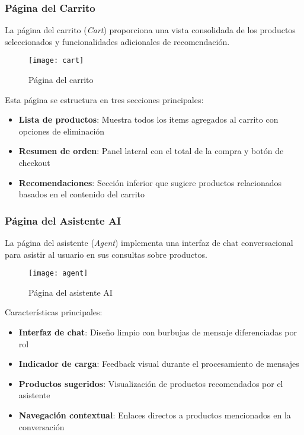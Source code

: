 \subsubsection{Página del Carrito}

La página del carrito (\textit{Cart}) proporciona una vista consolidada de los productos seleccionados y funcionalidades adicionales de recomendación.

\begin{figure}[H]
    \centering
    \texttt{[image: cart]}
    \caption{Página del carrito}
\end{figure}


Esta página se estructura en tres secciones principales:
\begin{itemize}
    \item \textbf{Lista de productos}: Muestra todos los items agregados al carrito con opciones de eliminación
    \item \textbf{Resumen de orden}: Panel lateral con el total de la compra y botón de checkout
    \item \textbf{Recomendaciones}: Sección inferior que sugiere productos relacionados basados en el contenido del carrito
\end{itemize}

\subsubsection{Página del Asistente AI}

La página del asistente (\textit{Agent}) implementa una interfaz de chat conversacional para asistir al usuario en sus consultas sobre productos.

\begin{figure}[H]
    \centering
    \texttt{[image: agent]}
    \caption{Página del asistente AI}
\end{figure}

Características principales:
\begin{itemize}
    \item \textbf{Interfaz de chat}: Diseño limpio con burbujas de mensaje diferenciadas por rol
    \item \textbf{Indicador de carga}: Feedback visual durante el procesamiento de mensajes
    \item \textbf{Productos sugeridos}: Visualización de productos recomendados por el asistente
    \item \textbf{Navegación contextual}: Enlaces directos a productos mencionados en la conversación
\end{itemize}


